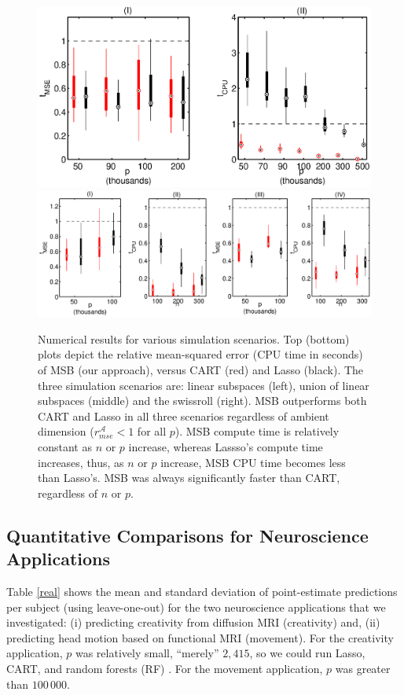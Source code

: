 \documentclass{article} %
\providecommand{\mc}[1]{\mathcal{#1}}
\newcommand{\dd}[1]{{\color{blue}{\it #1}}}
\begin{document}
\begin{figure}[h!]
\centering
 \vskip -0pt 
\includegraphics[width=.6\linewidth]{../figs/experiment1.eps} 
\includegraphics[width=0.8\linewidth]{../figs/nonlinear.eps} 
 \vskip -10pt 
\caption{
\dd{the panels will be re-arranged shortly to reflect the legend.}
Numerical results for various simulation scenarios.  Top (bottom) plots depict the relative mean-squared error (CPU time in seconds) of MSB (our approach), versus CART (red) and Lasso (black).  The three simulation scenarios are: linear subspaces (left), union of linear subspaces (middle) and the swissroll (right). MSB outperforms both CART and Lasso in all three scenarios regardless of ambient dimension ($r_{mse}^{\mc{A}}< 1$ for all $p$).  MSB compute time is relatively constant as $n$ or $p$ increase, whereas Lassso's compute time increases, thus, as $n$ or $p$ increase, MSB CPU time becomes less than Lasso's.  MSB was always significantly faster than CART, regardless of $n$ or $p$. } 

\label{fig:boxplots}
\end{figure}

 



\subsection{Quantitative Comparisons for Neuroscience Applications} \label{sub:real}



Table \ref{real} shows the mean and standard deviation of point-estimate predictions per subject (using leave-one-out) for the two neuroscience applications that we investigated: (i) predicting creativity from diffusion MRI (creativity) and, (ii) predicting head motion based on functional MRI (movement).  For the creativity application, $p$ was relatively small, ``merely'' $2,415$, so we could run Lasso, CART, and random forests (RF) \cite{Brieman2001}.  For the movement application, $p$ was greater than $100\,000$. 
\end{document}
